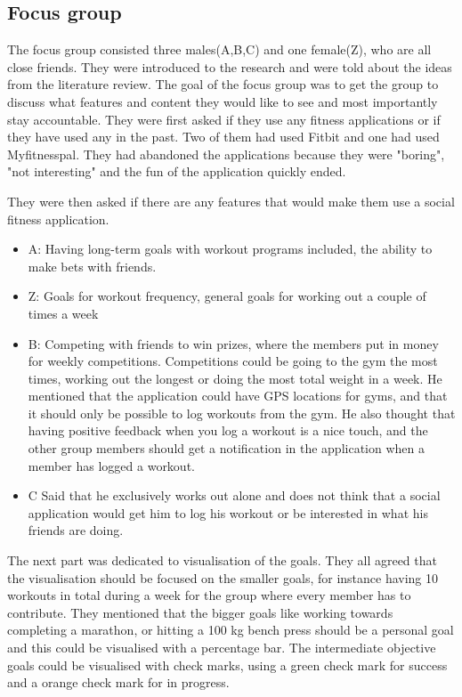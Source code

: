 \subsection{Focus group}
The focus group consisted three males(A,B,C) and one female(Z), who are all close friends. They were introduced to the research and were told about the ideas from the literature review. The goal of the focus group was to get the group to discuss what features and content they would like to see and most importantly stay accountable.
They were first asked if they use any fitness applications or if they have used any in the past. Two of them had used Fitbit and one had used Myfitnesspal. They had abandoned the applications because they were "boring", "not interesting" and the fun of the application quickly ended.

They were then asked if there are any features that would make them use a social fitness application.
\begin{itemize}
\item A: Having long-term goals with workout programs included, the ability to make bets with friends.
\item Z: Goals for workout frequency, general goals for working out a couple of times a week 
\item B: Competing with friends to win prizes, where the members put in money for weekly competitions. Competitions could be going to the gym the most times, working out the longest or doing the most total weight in a week. He mentioned that the application could have GPS locations for gyms, and that it should only be possible to log workouts from the gym. He also thought that having positive feedback when you log a workout is a nice touch, and the other group members should get a notification in the application when a member has logged a workout.
\item C Said that he exclusively works out alone and does not think that a social application would get him to log his workout or be interested in what his friends are doing.
\end{itemize}

The next part was dedicated to visualisation of the goals. They all agreed that the visualisation should be focused on the smaller goals, for instance having 10 workouts in total during a week for the group where every member has to contribute.  They mentioned that the bigger goals like working towards completing a marathon, or hitting a 100 kg bench press should be a personal goal and this could be visualised with a percentage bar. The intermediate objective goals could be visualised with check marks, using a green check mark for success and a orange check mark for in progress.

